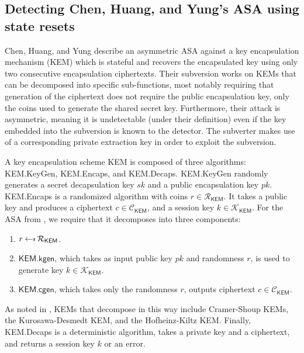 \subsection{Detecting Chen, Huang, and Yung's ASA using state resets} \label{sec:attackasas:chen}

Chen, Huang, and Yung \cite{AC:CheHuaYun20} describe an asymmetric ASA against a key encapsulation mechanism (KEM) which is stateful and recovers the encapsulated key using only two consecutive encapsulation ciphertexts. Their subversion works on KEMs that can be decomposed into specific sub-functions, most notably requiring that generation of the ciphertext does not require the public encapsulation key, only the coins used to generate the shared secret key. Furthermore, their attack is asymmetric, meaning it is undetectable (under their definition) even if the key embedded into the subversion is known to the detector. The subverter makes use of a corresponding private extraction key in order to exploit the subversion.

A key encapsulation scheme \textsf{KEM} is composed of three algorithms: \textsf{KEM.KeyGen}, \textsf{KEM.Encaps}, and \textsf{KEM.Decaps}. \textsf{KEM.KeyGen} randomly generates a secret decapsulation key $sk$ and a public encapsulation key $pk$. \textsf{KEM.Encaps} is a randomized algorithm with coins $r\in \mathcal{R}_\mathsf{KEM}$. It takes a public key and produces a ciphertext $c\in \mathcal{C}_\mathsf{KEM}$, and a session key $k\in \mathcal{K}_\mathsf{KEM}$. For the ASA from \cite{AC:CheHuaYun20}, we require that it decomposes into three components:
\begin{enumerate}\itemsep0em
\item $r\sample \mathcal{R}_\mathsf{KEM}$.
\item $\mathsf{KEM.kgen}$, which takes as input public key $pk$ and randomness $r$, is used to generate key $k\in \mathcal{K}_\mathsf{KEM}$.
\item $\mathsf{KEM.cgen}$, which takes only the randomness $r$, outputs ciphertext $c\in \mathcal{C}_\mathsf{KEM}$.
\end{enumerate}
As noted in \cite{AC:CheHuaYun20}, KEMs that decompose in this way include Cramer-Shoup KEMs, the Kurosawa-Desmedt KEM, and the Hofheinz-Kiltz KEM. Finally, \textsf{KEM.Decaps} is a deterministic algorithm, takes a private key and a ciphertext, and returns a session key $k$ or an error.

